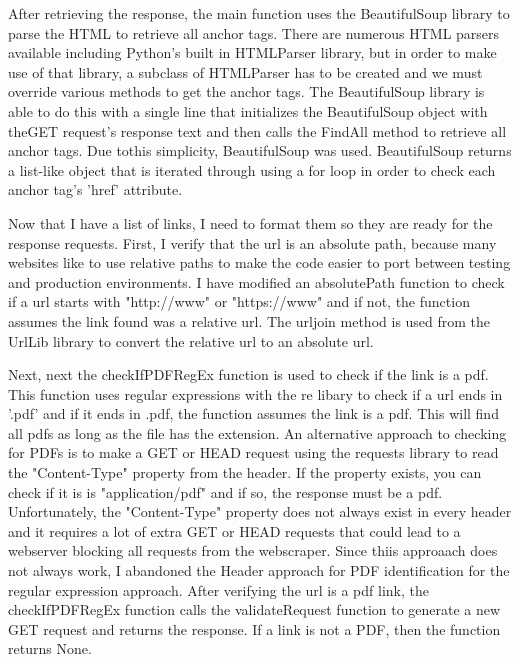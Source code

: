 \documentclass[12pt]{article}
\begin{document}
After retrieving the response, the main function uses the BeautifulSoup library to parse the HTML to retrieve all anchor tags. There are numerous HTML parsers available including Python's built in HTMLParser library, but in order to make use of that library, a subclass of HTMLParser has to be created and we must override various methods to get the anchor tags. The BeautifulSoup library is able to do this with a single line that initializes the BeautifulSoup object with theGET request's response text and then calls the FindAll method to retrieve all anchor tags. Due tothis simplicity, BeautifulSoup was used.  BeautifulSoup returns a list-like object that is iterated through using a for loop in order to check each anchor tag's 'href' attribute. 

Now that I have a list of links, I need to format them so they are ready for the response requests. First, I verify that the url is an absolute path, because many websites like to use relative paths to make the code easier to port between testing and production environments. I have modified an absolutePath function \cite{stackOverflowRelativePath} to check if a url starts with "http://www" or "https://www" and if not, the function assumes the link found was a relative url. The urljoin method is used from the UrlLib library to convert the relative url to an absolute url.

Next, next the checkIfPDFRegEx function is used to check if the link is a pdf. This function uses regular expressions with the re libary to check if a url ends in '.pdf' and if it ends in .pdf, the function assumes the link is a pdf. This will find all pdfs as long as the file has the extension. An alternative approach to checking for PDFs is to make a GET or HEAD request using the requests library to read the "Content-Type" property from the header.  If the property exists, you can check if it is is "application/pdf" and if so, the response must be a pdf. Unfortunately, the "Content-Type" property does not always exist in every header and it requires a lot of extra GET or HEAD requests that could lead to a webserver blocking all requests from the webscraper. Since thiis approaach does not always work, I abandoned the Header approach for PDF identification for the regular expression approach. After verifying the url is a pdf link, the checkIfPDFRegEx function calls the validateRequest function to generate a new GET request and returns the response. If a link is not a PDF, then the function returns None. 
\end{document}
